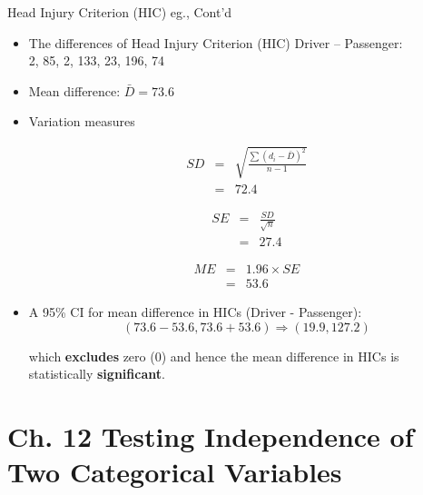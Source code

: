 \documentclass[14pt]{beamer}\usepackage[]{graphicx}\usepackage[]{color}
\begin{document}
\begin{frame}[fragile]{Head Injury Criterion (HIC) eg., Cont'd}

{\footnotesize{
\begin{itemize}
\item<1-> The differences of Head Injury Criterion (HIC) Driver -- Passenger: \\
2, 85, 2, 133, 23, 196, 74
\item<2-> Mean difference: $\bar{D} = 73.6$
\item<3-> Variation measures

\begin{minipage}[ht]{3.3cm}

{\scriptsize{
\begin{eqnarray*}
SD &=& \sqrt{ \frac{ \sum (d_i - \bar{D})^2}{n - 1}} \\ 
&=&  72.4
\end{eqnarray*}
}}
\end{minipage}
\begin{minipage}[ht]{3.3cm}

{\scriptsize{
\begin{eqnarray*}
SE &=& \frac{SD}{\sqrt{n}} \\
&=&   27.4
\end{eqnarray*}
}}
\end{minipage}
\begin{minipage}[ht]{3.3cm}

{\scriptsize{
\begin{eqnarray*}
ME &=&  1.96 \times SE \\
&=&   53.6
\end{eqnarray*}
}}
\end{minipage}

\vspace{-6mm}
\item<4-> A 95\% CI for mean difference in HICs (Driver - Passenger):
\begin{equation*}
  (73.6 - 53.6, 73.6 + 53.6) \Rightarrow (19.9, 127.2)
\end{equation*}

  which \textbf{excludes} zero (0) and hence the mean difference in HICs is  statistically \textbf{significant}.

\end{itemize}
}}
\end{frame}



\section{Ch. 12 Testing Independence of Two Categorical  Variables}
\end{document}
